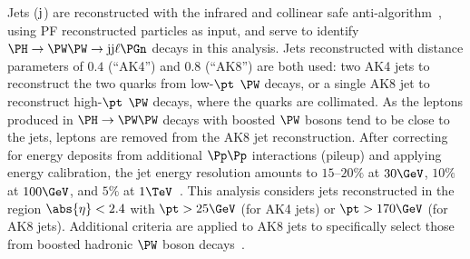 Jets ($\mathrm{j}$) are reconstructed with the infrared and collinear safe anti-\kt algorithm~\cite{Cacciari:2008gp, Cacciari:2011ma},
using PF reconstructed particles as input,
and serve to identify $\PHiggs \to \PW\PW \to \jet\jet\Plepton\Pnu$ decays in this analysis.
Jets reconstructed with distance parameters of $0.4$ (``AK4'') and $0.8$ (``AK8'') are both used:
two AK4 jets to reconstruct the two quarks from low-$\pt$ $\PW$ decays, or a single AK8 jet to reconstruct high-$\pt$
$\PW$ decays, where the quarks are collimated.
As the leptons produced in $\PHiggs \to \PW\PW$ decays with boosted $\PW$ bosons tend to be close to the jets,
leptons are removed from the AK8 jet reconstruction.
After correcting for energy deposits from additional $\Pp\Pp$ interactions (pileup) and applying energy calibration,
the jet energy resolution amounts to $15$--$20\%$ at $30\GeV$, $10\%$ at $100\GeV$, and $5\%$ at $1\TeV$~\cite{Khachatryan:2016kdb}.
This analysis considers jets reconstructed in the region $\abs{\eta} < 2.4$
with $\pt > 25\GeV$ (for AK4 jets) or $\pt > 170\GeV$ (for AK8 jets).
Additional criteria are applied to AK8 jets to specifically select those from boosted hadronic $\PW$ boson decays~\cite{Sirunyan:2019quj}.


